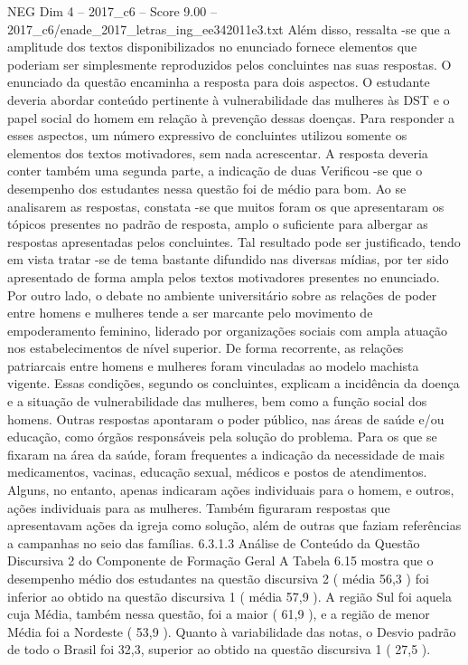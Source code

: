 \begin{textsample}{NEG Dim 4 – 2017\_c6 – Score 9.00 – 2017\_c6/enade\_2017\_letras\_ing\_ee342011e3.txt}
Além disso, ressalta -se que a amplitude dos textos disponibilizados no enunciado fornece elementos que poderiam ser simplesmente reproduzidos pelos concluintes nas suas respostas.
O enunciado da questão encaminha a resposta para dois aspectos.
O estudante deveria abordar conteúdo pertinente à vulnerabilidade das mulheres às DST e o papel social do homem em relação à prevenção dessas doenças.
Para responder a esses aspectos, um número expressivo de concluintes utilizou somente os elementos dos textos motivadores, sem nada acrescentar.
A resposta deveria conter também uma segunda parte, a indicação de duas Verificou -se que o desempenho dos estudantes nessa questão foi de médio para bom.
Ao se analisarem as respostas, constata -se que muitos foram os que apresentaram os tópicos presentes no padrão de resposta, amplo o suficiente para albergar as respostas apresentadas pelos concluintes.
Tal resultado pode ser justificado, tendo em vista tratar -se de tema bastante difundido nas diversas mídias, por ter sido apresentado de forma ampla pelos textos motivadores presentes no enunciado.
Por outro lado, o debate no ambiente universitário sobre as relações de poder entre homens e mulheres tende a ser marcante pelo movimento de empoderamento feminino, liderado por organizações sociais com ampla atuação nos estabelecimentos de nível superior.
De forma recorrente, as relações patriarcais entre homens e mulheres foram vinculadas ao modelo machista vigente.
Essas condições, segundo os concluintes, explicam a incidência da doença e a situação de vulnerabilidade das mulheres, bem como a função social dos homens.
Outras respostas apontaram o poder público, nas áreas de saúde e/ou educação, como órgãos responsáveis pela solução do problema.
Para os que se fixaram na área da saúde, foram frequentes a indicação da necessidade de mais medicamentos, vacinas, educação sexual, médicos e postos de atendimentos.
Alguns, no entanto, apenas indicaram ações individuais para o homem, e outros, ações individuais para as mulheres.
Também figuraram respostas que apresentavam ações da igreja como solução, além de outras que faziam referências a campanhas no seio das famílias. 6.3.1.3 Análise de Conteúdo da Questão Discursiva 2 do Componente de Formação Geral A Tabela 6.15 mostra que o desempenho médio dos estudantes na questão discursiva 2 ( média 56,3 ) foi inferior ao obtido na questão discursiva 1 ( média 57,9 ).
A região Sul foi aquela cuja Média, também nessa questão, foi a maior ( 61,9 ), e a região de menor Média foi a Nordeste ( 53,9 ).
Quanto à variabilidade das notas, o Desvio padrão de todo o Brasil foi 32,3, superior ao obtido na questão discursiva 1 ( 27,5 ).

\end{textsample}
